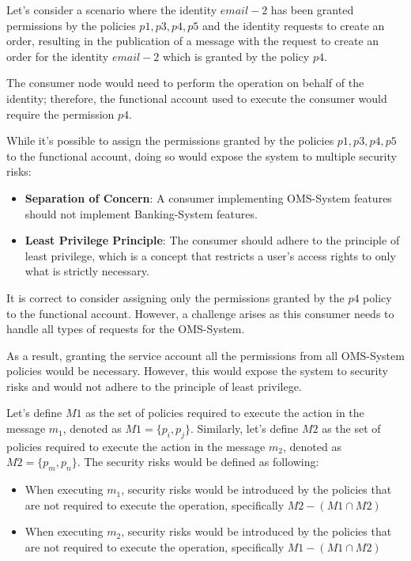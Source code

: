 \vspace{15pt}

Let's consider a scenario where the identity $email-2$ has been granted permissions by the policies $p1, p3, p4, p5$ and the identity requests to create an order, resulting in the publication of a message with the request to create an order for the identity $email-2$ which is granted by the policy $p4$.

\vspace{15pt}

The consumer node would need to perform the operation on behalf of the identity; therefore, the functional account used to execute the consumer would require the permission $p4$. 

\vspace{15pt}

While it's possible to assign the permissions granted by the policies $p1, p3, p4, p5$ to the functional account, doing so would expose the system to multiple security risks:
\begin{itemize}
    \item \textbf{Separation of Concern}: A consumer implementing OMS-System features should not implement Banking-System features.
    \item \textbf{Least Privilege Principle}: The consumer should adhere to the principle of least privilege, which is a concept that restricts a user's access rights to only what is strictly necessary.
\end{itemize}

\vspace{15pt}

It is correct to consider assigning only the permissions granted by the $p4$ policy to the functional account. 
However, a challenge arises as this consumer needs to handle all types of requests for the OMS-System.

As a result, granting the service account all the permissions from all OMS-System policies would be necessary. 
However, this would expose the system to security risks and would not adhere to the principle of least privilege.

\vspace{15pt}

Let's define $M1$ as the set of policies required to execute the action in the message $m_1$, denoted as $M1 = \{p_i, p_j\}$. Similarly, let's define $M2$ as the set of policies required to execute the action in the message $m_2$, denoted as $M2 = \{p_m, p_n\}$. 
The security risks would be defined as following:
\begin{itemize}
    \item When executing $m_1$, security risks would be introduced by the policies that are not required to execute the operation, specifically $M2 - (M1 \cap M2)$
    \item When executing $m_2$, security risks would be introduced by the policies that are not required to execute the operation, specifically $M1 - (M1 \cap M2)$
\end{itemize}

